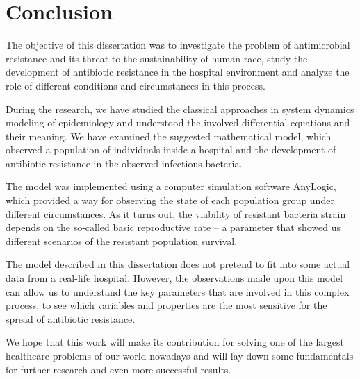\chapter*{Conclusion}

The objective of this dissertation was to investigate the problem of antimicrobial resistance and its threat to the sustainability of human race, study the development of antibiotic resistance in the hospital environment and analyze the role of different conditions and circumstances in this process.

During the research, we have studied the classical approaches in system dynamics modeling of epidemiology and understood the involved differential equations and their meaning. We have examined the suggested mathematical model, which observed a population of individuals inside a hospital and the development of antibiotic resistance in the observed infectious bacteria.

The model was implemented using a computer simulation software AnyLogic, which provided a way for observing the state of each population group under different circumstances. As it turns out, the viability of resistant bacteria strain depends on the so-called basic reproductive rate -- a parameter that showed us different scenarios of the resistant population survival.

The model described in this dissertation does not pretend to fit into some actual data from a real-life hospital. However, the observations made upon this model can allow us to understand the key parameters that are involved in this complex process, to see which variables and properties are the most sensitive for the spread of antibiotic resistance.

We hope that this work will make its contribution for solving one of the largest healthcare problems of our world nowadays and will lay down some fundamentals for further research and even more successful results.